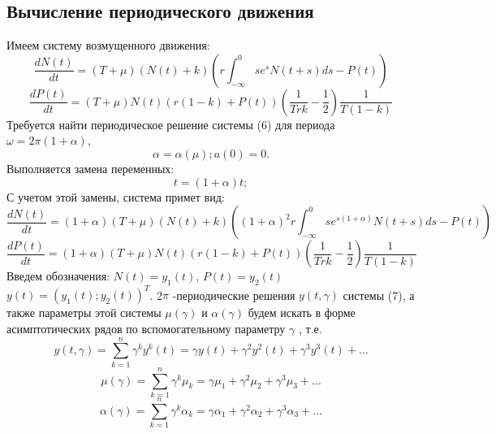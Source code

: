 \documentclass[12pt]{article}
\begin{document}
\subsection{Вычисление периодического движения}
 Имеем систему возмущенного движения:
  \begin{equation}
      \frac{d N(t)}{d t}= (T+\mu)(N(t)+k)\left( r\int_{-\infty}^{0} s e^s  N(t+s) d s - P(t) \right)
  \end{equation}
\begin{equation*}
      \frac{d P(t)}{d t}= (T+\mu)N(t)( r(1-k) + P(t) )\left( \frac{1}{T r k} - \frac{1}{2}\right)\frac{1}{T(1-k)}
  \end{equation*}
  Требуется найти периодическое решение системы (6) для периода $\omega=2 \pi (1+\alpha)$,
   \begin{equation*}
       \alpha=\alpha (\mu); a(0)=0.
       \end{equation*}
Выполняется замена  переменных:
\begin{equation*}
    t=(1+\alpha)t; 
\end{equation*}
С учетом этой замены, система примет вид:
\begin{equation} 
      \frac{d N(t)}{d t}=(1+\alpha) (T+\mu)(N(t)+k)\left( (1+\alpha)^2 r\int_{-\infty}^{0} s e^{s (1+\alpha)}  N(t+s) d s - P(t) \right)
\end{equation}
\begin{equation*}
      \frac{d P(t)}{d t}=(1+\alpha) (T+\mu)N(t)( r(1-k) + P(t) )\left( \frac{1}{T r k} - \frac{1}{2}\right)\frac{1}{T(1-k)}
  \end{equation*}
  Введем обозначения: $N(t)=y_1 (t)$, $P(t)=y_2 (t)$ $y(t)=(y_1 (t); y_2(t))^T$. 2$\pi$ -периодические решения $y(t,\gamma)$ системы (7), а также параметры этой системы $\mu(\gamma)$ и $\alpha(\gamma)$ будем искать в форме асимптотических рядов по вспомогательному параметру $\gamma$ \cite{has}, т.е.
  \begin{equation}
      y(t,\gamma)=\sum_{k=1}^n \gamma^k y^k (t)= \gamma y(t)+\gamma^2 y^2(t)+\gamma^3 y^3(t)+\ldots
 \label{math/2}
  \end{equation}
   \begin{equation} \label{mu}
       \mu(\gamma)=\sum_{k=1}^n \gamma^k \mu_k = \gamma \mu_1+\gamma^2 \mu_2+\gamma^3 \mu_3+\ldots
  \end{equation}
  \begin{equation}
       \alpha(\gamma)=\sum_{k=1}^n \gamma^k \alpha_k = \gamma \alpha_1+\gamma^2 \alpha_2+\gamma^3 \alpha_3+\ldots
  \end{equation}
\end{document}
